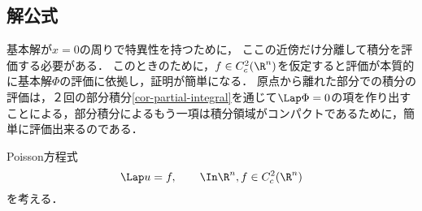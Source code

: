 \documentclass[uplatex,dvipdfmx]{jsreport}
\begin{document}
\subsection{解公式}

\begin{tcolorbox}[colframe=ForestGreen, colback=ForestGreen!10!white,breakable,colbacktitle=ForestGreen!40!white,coltitle=black,fonttitle=\bfseries\sffamily,
    title=]
    基本解が$x=0$の周りで特異性を持つために，
    ここの近傍だけ分離して積分を評価する必要がある．
    このときのために，$f\in C_c^2(\R^n)$を仮定すると評価が本質的に基本解$\Phi$の評価に依拠し，証明が簡単になる．
    原点から離れた部分での積分の評価は，２回の部分積分\ref{cor-partial-integral}を通じて$\Lap\Phi=0$の項を作り出すことによる，部分積分によるもう一項は積分領域がコンパクトであるために，簡単に評価出来るのである．
\end{tcolorbox}

\begin{problem}
    Poisson方程式
    \[\Lap u=f,\qquad \In\R^n,f\in C_c^2(\R^n)\]
    を考える．
\end{problem}
\end{document}
